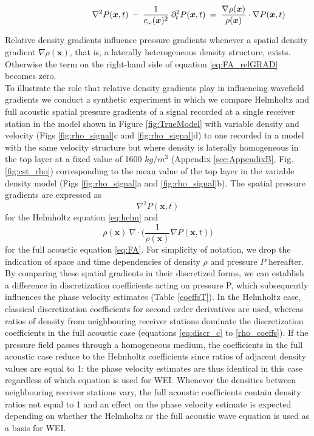 \documentclass[]{article}
\begin{document}
	\begin{align}\label{eq:FA_relGRAD}
		\shoveright \shoveright \shoveright \shoveright \shoveright \shoveright \shoveright \shoveright %
		\; \nabla^{2} P(\bm{x},t) \: - \: \frac{1}{c_{\omega}(\bm{x})^{2}}  \: \partial_{t}^{2} P(\bm{x},t)  &\: = \: \frac{\nabla \rho(\bm{x})}{\rho(\bm{x})} \cdot \nabla P(\bm{x},t) 
	\end{align}
	
	Relative density gradients influence pressure gradients whenever a spatial density gradient $\nabla \rho(\bm{x})$, that is, a laterally heterogeneous density structure, exists. Otherwise the term on the right-hand side of equation \eqref{eq:FA_relGRAD} becomes zero.  \\
	
	To illustrate the role that relative density gradients play in influencing wavefield gradients we conduct a synthetic experiment in which we compare Helmholtz and full acoustic spatial pressure gradients of a signal recorded at a single receiver station in the model shown in Figure \ref{fig:TrueModel} with variable density and velocity (Figs \ref{fig:rho_signal}c and \ref{fig:rho_signal}d) to one recorded in a model with the same velocity structure but where density is laterally homogeneous in the top layer at a fixed value of 1600 $kg/m^{3}$ (Appendix \ref{sec:AppendixB}, Fig. \ref{fig:cst_rho}) corresponding to the mean value of the top layer in the variable density model (Figs \ref{fig:rho_signal}a and \ref{fig:rho_signal}b). The spatial pressure gradients are expressed as 
	\begin{equation}\label{eq:spatial_HELM}
	\nabla^{2} P(\bm{x},t)
	\end{equation}
	for the Helmholtz equation \ref{eq:helm} and 
	\begin{equation}\label{eq:spatial_FA}
		\rho(\bm{x}) \: \nabla \cdot \bigg(\frac{1}{\rho(\bm{x})} \nabla P(\bm{x},t) \bigg)
	\end{equation}
	for the full acoustic equation \eqref{eq:FA}. For simplicity of notation, we drop the indication of space and time dependencies of density $\rho$ and pressure $P$ hereafter. By comparing these spatial gradients in their discretized forms, we can establish a difference in discretization coefficients acting on pressure P, which subsequently influences the phase velocity estimates (Table \ref{coeffsT}). In the Helmholtz case, classical discretization coefficients for second order derivatives are used, whereas ratios of density from neighbouring receiver stations dominate the discretization coefficients in the full acoustic case (equations \ref{eq:discr_c} to \ref{rho_coeffs}). If the pressure field passes through a homogeneous medium, the coefficients in the full acoustic case reduce to the Helmholtz coefficients since ratios of adjacent density values are equal to 1: the phase velocity estimates are thus identical in this case regardless of which equation is used for WEI. Whenever the densities between neighbouring receiver stations vary, the full acoustic coefficients contain density ratios not equal to 1 and an effect on the phase velocity estimate is expected depending on whether the Helmholtz or the full acoustic wave equation is used as a basis for WEI.\\
	
\end{document}

